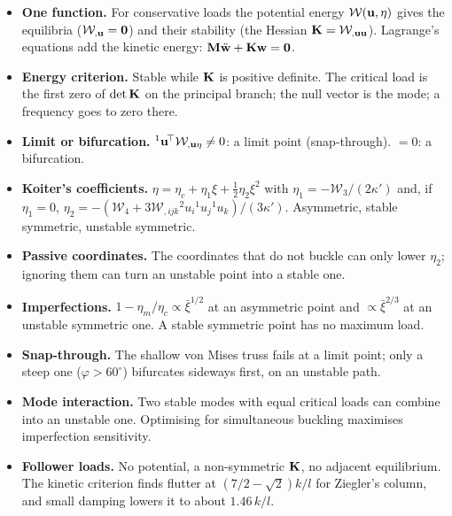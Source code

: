 \begin{gbox*}
\begin{itemize}
  \item \textbf{One function.} For conservative loads the potential energy
        $\mathcal{W}(\mathbf{u},\eta)$ gives the equilibria ($\mathcal{W}_{,\mathbf{u}} = \mathbf{0}$)
        and their stability (the Hessian $\mathbf{K} = \mathcal{W}_{,\mathbf{u}\mathbf{u}}$). Lagrange's
        equations add the kinetic energy: $\mathbf{M}\ddot{\mathbf{w}} + \mathbf{K}\mathbf{w} = \mathbf{0}$.
  \item \textbf{Energy criterion.} Stable while $\mathbf{K}$ is positive definite. The
        critical load is the first zero of $\det\mathbf{K}$ on the principal branch; the
        null vector is the mode; a frequency goes to zero there.
  \item \textbf{Limit or bifurcation.} ${}^1\mathbf{u}^{\!\top}\mathcal{W}_{,\mathbf{u}\eta} \neq 0$: a limit
        point (snap-through). $= 0$: a bifurcation.
  \item \textbf{Koiter's coefficients.} $\eta = \eta_c + \eta_1\xi + \tfrac12\eta_2\xi^2$ with
        $\eta_1 = -\mathcal{W}_3/(2\kappa')$ and, if $\eta_1 = 0$,
        $\eta_2 = -(\mathcal{W}_4 + 3\mathcal{W}_{,ijk}{}^2u_i{}^1u_j{}^1u_k)/(3\kappa')$.
        Asymmetric, stable symmetric, unstable symmetric.
  \item \textbf{Passive coordinates.} The coordinates that do not buckle can only
        lower $\eta_2$; ignoring them can turn an unstable point into a stable one.
  \item \textbf{Imperfections.} $1 - \eta_m/\eta_c \propto \bar\xi^{1/2}$ at an asymmetric
        point and $\propto \bar\xi^{2/3}$ at an unstable symmetric one. A stable symmetric
        point has no maximum load.
  \item \textbf{Snap-through.} The shallow von Mises truss fails at a limit point; only
        a steep one ($\varphi > 60^\circ$) bifurcates sideways first, on an unstable path.
  \item \textbf{Mode interaction.} Two stable modes with equal critical loads can
        combine into an unstable one. Optimising for simultaneous buckling maximises
        imperfection sensitivity.
  \item \textbf{Follower loads.} No potential, a non-symmetric $\mathbf{K}$, no adjacent
        equilibrium. The kinetic criterion finds flutter at $(7/2 - \sqrt2)k/l$ for
        Ziegler's column, and small damping lowers it to about $1.46\,k/l$.
\end{itemize}
\end{gbox*}

